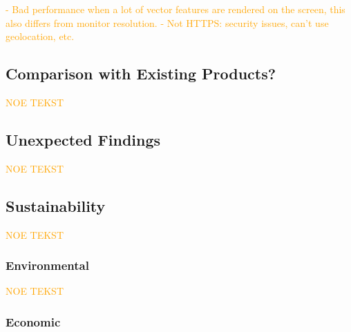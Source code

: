 \textcolor{orange}{- Bad performance when a lot of vector features are rendered on the screen, this also differs from monitor resolution. - Not HTTPS: security issues, can't use geolocation, etc.}

\subsection{Comparison with Existing Products?}

\textcolor{orange}{NOE TEKST}

\subsection{Unexpected Findings} %

\textcolor{orange}{NOE TEKST}

\subsection{Sustainability} %

\textcolor{orange}{NOE TEKST}

\subsubsection{Environmental}

\textcolor{orange}{NOE TEKST}
\begin{comment}
LENKE FRA PETER: https://www.ntnu.edu/web/excited/sustainability-in-computing-education
- mer lukkede hogstformer og mindre bruk av flatehogst 
- **lavere drivstofforbruk og smartere kjøring med skogsmaskin** 
    - **lavere førerbelastning**
    - **mindre terrengslitasje**
    - **høyere produktivitet**
- produsere tømmer som er mest mulig tilpasset industriens behov 
- **videreutvikle teknologi for driftsoppfølging og førerstøtte for maskinførerne** 

###########################
FNs Bærekraftsmål som virker relevante (KANSKJE SAMMENLIGN MED HVA NORGE GJØR I DAG?):
- 9
- 12 (?) VIRKER SOM DEN FOKUSERER MEST PÅ UTVIKLINGSLAND?
- 15 (?)
\end{comment}

\subsubsection{Economic}

